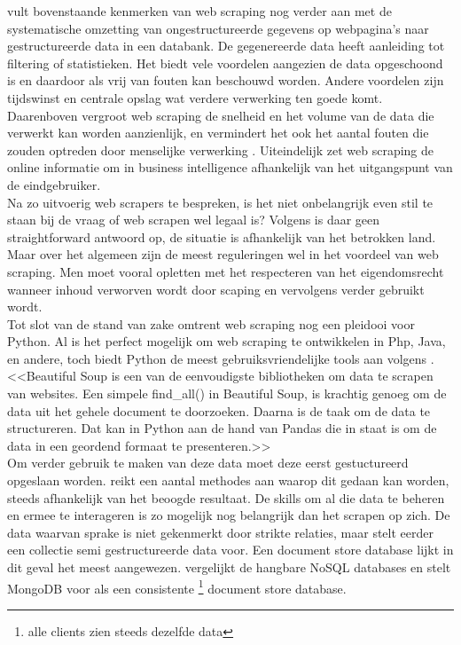 \textcite{Singrodia2019} vult bovenstaande kenmerken van web scraping nog verder aan met de systematische omzetting van ongestructureerde gegevens op webpagina's naar gestructureerde data in een databank. De gegenereerde data heeft aanleiding tot filtering of statistieken. Het biedt vele voordelen aangezien de data opgeschoond is en daardoor als vrij van fouten kan beschouwd worden. Andere voordelen zijn tijdswinst en centrale opslag wat verdere verwerking ten goede komt.\\
Daarenboven vergroot web scraping de snelheid en het volume van de data die verwerkt kan worden aanzienlijk, en vermindert het ook het aantal fouten die zouden optreden door menselijke verwerking \autocite{Bhatt2023}. Uiteindelijk zet web scraping de online informatie om in business intelligence afhankelijk van het uitgangspunt van de eindgebruiker.\\
Na zo uitvoerig web scrapers te bespreken, is het niet onbelangrijk even stil te staan bij de vraag of web scrapen wel legaal is? Volgens \textcite{EPSI2015} is daar geen straightforward antwoord op, de situatie is afhankelijk van het betrokken land. Maar over het algemeen zijn de meest reguleringen wel in het voordeel van web scraping. Men moet vooral opletten met het respecteren van het eigendomsrecht wanneer inhoud verworven wordt door scaping en vervolgens verder gebruikt wordt.\\
Tot slot van de stand van zake omtrent web scraping nog een pleidooi voor Python. Al is het perfect mogelijk om web scraping te ontwikkelen in Php, Java, en andere, toch biedt Python de meest gebruiksvriendelijke tools aan volgens \textcite{Kumar2023}. <<Beautiful Soup is een van de eenvoudigste bibliotheken om data te scrapen van websites. Een simpele find\_all() in Beautiful Soup, is krachtig genoeg om de data uit het gehele document te doorzoeken. Daarna is de taak om de data te structureren. Dat kan in Python aan de hand van Pandas die in staat is om de data in een geordend formaat te presenteren.>>\\
Om verder gebruik te maken van deze data moet deze eerst gestuctureerd opgeslaan worden. \textcite{Mitchell2015} reikt een aantal methodes aan waarop dit gedaan kan worden, steeds afhankelijk van het beoogde resultaat. De skills om al die data te beheren en ermee te interageren is zo mogelijk nog belangrijk dan het scrapen op zich. De data waarvan sprake is niet gekenmerkt door strikte relaties, maar stelt eerder een collectie semi gestructureerde data voor. Een document store database lijkt in dit geval het meest aangewezen. \textcite{Lourenco2015} vergelijkt de hangbare NoSQL databases en stelt MongoDB voor als een consistente \footnote{alle clients zien steeds dezelfde data} document store database.\\
